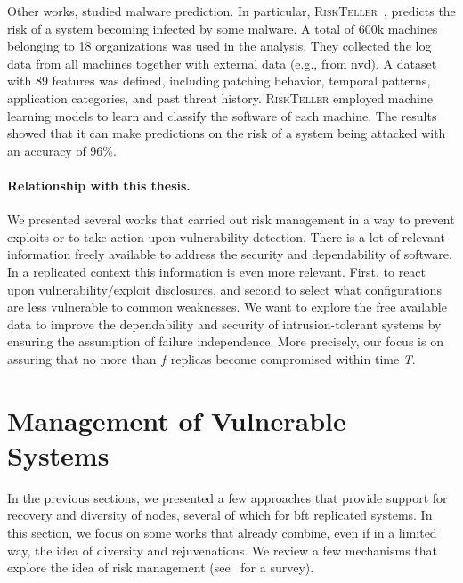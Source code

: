 Other works, studied malware prediction. 
In particular, \textsc{RiskTeller}~\cite{Bilge:2017}, predicts the risk of a system becoming infected by some malware.
A total of 600k machines belonging to 18 organizations was used in the analysis.
They collected the log data from all machines together with external data (e.g., from \gls{nvd}).
A dataset with 89 features was defined, including patching behavior, temporal patterns, application categories, and past threat history.
\textsc{RiskTeller} employed machine learning models to learn and classify the software of each machine.
The results showed that it can make predictions on the risk of a system being attacked with an accuracy of 96\%. 


\paragraph{Relationship with this thesis.} 
We presented several works that carried out risk management in a way to prevent exploits or to take action upon vulnerability detection. 
There is a lot of relevant information freely available to address the security and dependability of software. 
In a replicated context this information is even more relevant. 
First, to react upon vulnerability/exploit disclosures, and second to select what configurations are less vulnerable to common weaknesses. 
We want to explore the free available data to improve the dependability and security of intrusion-tolerant systems by ensuring the assumption of failure independence.
More precisely, our focus is on assuring that no more than $f$ replicas become compromised within time \emph{T}.


\section{Management of Vulnerable Systems}
In the previous sections, we presented a few approaches that provide support for recovery and diversity of nodes, several of which for \gls{bft} replicated systems.
In this section, we focus on some works that already combine, even if in a limited way, the idea of diversity and rejuvenations.
We review a few mechanisms that explore the idea of risk management (see~\cite{Yuan:2014} for a survey).


